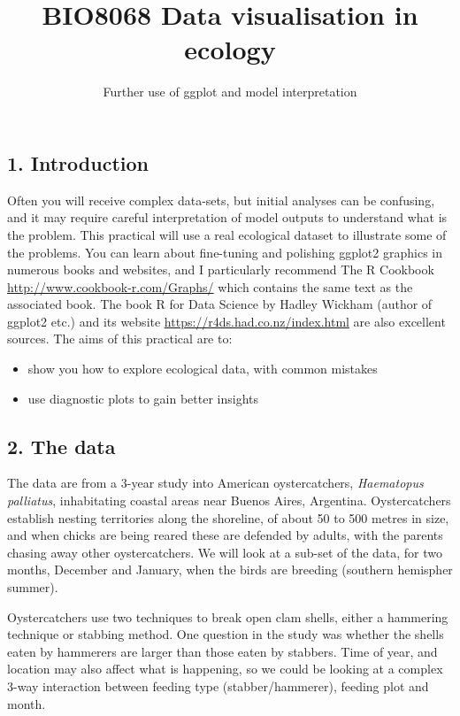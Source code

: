 \documentclass[]{article}
\title{BIO8068 Data visualisation in ecology}
\subtitle{Further use of ggplot and model interpretation}
\author{}
\date{}
\providecommand{\tightlist}{%
  \setlength{\itemsep}{0pt}\setlength{\parskip}{0pt}}
\begin{document}
\maketitle

\subsection{1. Introduction}\label{introduction}

Often you will receive complex data-sets, but initial analyses can be
confusing, and it may require careful interpretation of model outputs to
understand what is the problem. This practical will use a real
ecological dataset to illustrate some of the problems. You can learn
about fine-tuning and polishing ggplot2 graphics in numerous books and
websites, and I particularly recommend The R Cookbook
\url{http://www.cookbook-r.com/Graphs/} which contains the same text as
the associated book. The book R for Data Science by Hadley Wickham
(author of ggplot2 etc.) and its website
\url{https://r4ds.had.co.nz/index.html} are also excellent sources. The
aims of this practical are to:

\begin{itemize}
\tightlist
\item
  show you how to explore ecological data, with common mistakes
\item
  use diagnostic plots to gain better insights
\end{itemize}

\subsection{2. The data}\label{the-data}

The data are from a 3-year study into American oystercatchers,
\emph{Haematopus palliatus}, inhabitating coastal areas near Buenos
Aires, Argentina. Oystercatchers establish nesting territories along the
shoreline, of about 50 to 500 metres in size, and when chicks are being
reared these are defended by adults, with the parents chasing away other
oystercatchers. We will look at a sub-set of the data, for two months,
December and January, when the birds are breeding (southern hemispher
summer).

Oystercatchers use two techniques to break open clam shells, either a
hammering technique or stabbing method. One question in the study was
whether the shells eaten by hammerers are larger than those eaten by
stabbers. Time of year, and location may also affect what is happening,
so we could be looking at a complex 3-way interaction between feeding
type (stabber/hammerer), feeding plot and month.
\end{document}
